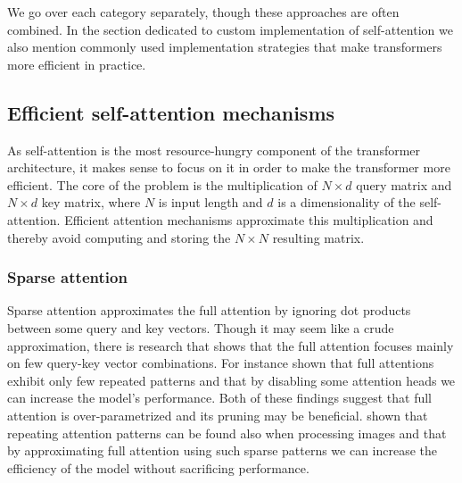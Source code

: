 We go over each category separately, though these approaches are often
combined. In the section dedicated to custom implementation of self-attention
we also mention commonly used implementation strategies that make transformers
more efficient in practice.

\subsection{Efficient self-attention mechanisms}


As self-attention is the most resource-hungry component of the transformer
architecture, it makes sense to focus on it in order to make the transformer
more efficient. The core of the problem is the multiplication of $N\times d$
query matrix and $N\times d$ key matrix, where $N$ is input length and $d$ is a
dimensionality of the self-attention. Efficient attention mechanisms approximate
this multiplication and thereby avoid computing and storing the $N\times N$
resulting matrix.

\subsubsection{Sparse attention}

Sparse attention approximates the full attention by ignoring dot products between
some query and key vectors. Though it may seem like a crude approximation, there
is research that shows that the full attention focuses mainly on few query-key
vector combinations. For instance \cite{kovaleva2019revealing} shown that full
attentions exhibit only few repeated patterns and that by disabling some
attention heads we can increase the model's performance. Both of these findings
suggest that full attention is over-parametrized and its pruning may be
beneficial. \cite{child2019generating} shown that repeating attention patterns
can be found also when processing images and that by approximating full
attention using such sparse patterns we can increase the efficiency of the model
without sacrificing performance.

